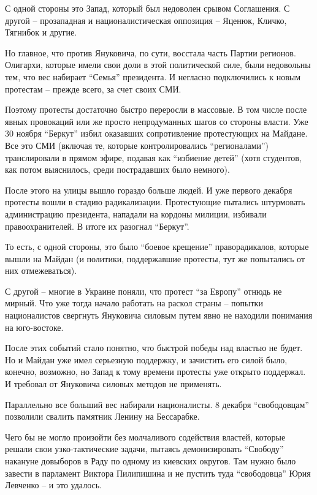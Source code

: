 С одной стороны это Запад, который был недоволен срывом Соглашения. С
другой – прозападная и националистическая оппозиция – Яценюк, Кличко,
Тягнибок и другие.

Но главное, что против Януковича, по сути, восстала часть Партии регионов.
Олигархи, которые имели свои доли в этой политической силе, были
недовольны тем, что вес набирает \enquote{Семья} президента. И негласно
подключились к новым протестам – прежде всего, за счет своих СМИ. 

Поэтому протесты достаточно быстро переросли в массовые. В том числе после
явных провокаций или же просто непродуманных шагов со стороны власти. Уже
30 ноября \enquote{Беркут} избил оказавших сопротивление протестующих на Майдане.
Все это СМИ (включая те, которые контролировались \enquote{регионалами})
транслировали в прямом эфире, подавая как \enquote{избиение детей} (хотя
студентов, как потом выяснилось, среди пострадавших было немного). 

После этого на улицы вышло гораздо больше людей. И уже первого декабря
протесты вошли в стадию радикализации. Протестующие пытались штурмовать
администрацию президента, нападали на кордоны милиции, избивали
правоохранителей. В итоге их разогнал \enquote{Беркут}. 

То есть, с одной стороны, это было \enquote{боевое крещение} праворадикалов,
которые вышли на Майдан (и политики, поддержавшие протесты, тут же
попытались от них отмежеваться).

С другой – многие в Украине поняли, что протест \enquote{за Европу} отнюдь не
мирный. Что уже тогда начало работать на раскол страны – попытки
националистов свергнуть Януковича силовым путем явно не находили понимания
на юго-востоке.

После этих событий стало понятно, что быстрой победы над властью не будет.
Но и Майдан уже имел серьезную поддержку, и зачистить его силой было,
конечно, возможно, но Запад к тому времени протесты уже открыто поддержал.
И требовал от Януковича силовых методов не применять.

Параллельно все больший вес набирали националисты. 8 декабря \enquote{свободовцам}
позволили свалить памятник Ленину на Бессарабке.

Чего бы не могло произойти без молчаливого содействия властей, которые
решали свои узко-тактические задачи, пытаясь демонизировать \enquote{Свободу}
накануне довыборов в Раду по одному из киевских округов. Там нужно было
завести в парламент Виктора Пилипишина и не пустить туда \enquote{свободовца} Юрия
Левченко – и это удалось.

